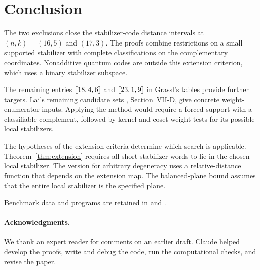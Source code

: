 \section{Conclusion}\label{sec:conclusion}

The two exclusions close the stabilizer-code distance intervals at
\((n,k)=(16,5)\) and \((17,3)\). The proofs combine restrictions on a
small supported stabilizer with complete classifications on the
complementary coordinates. Nonadditive quantum codes are outside this
extension criterion, which uses a binary stabilizer subspace.

The remaining entries \([\![18,4,6]\!]\) and \([\![23,1,9]\!]\) in
Grassl's tables \cite{grassl} provide further targets. Lai's remaining
candidate sets \cite{lai}, Section~VII-D, give concrete weight-enumerator
inputs. Applying the method would require a forced support with a
classifiable complement, followed by kernel and coset-weight tests for
its possible local stabilizers.

The hypotheses of the extension criteria determine which search is
applicable. Theorem~\ref{thm:extension} requires all short stabilizer words to lie in the chosen local
stabilizer. The version for arbitrary degeneracy uses a relative-distance
function that depends on the extension map. The balanced-plane bound
assumes that the entire local stabilizer is the specified plane.

Benchmark data and programs are retained in 
and .

\noindent\begin{minipage}{\linewidth}
\paragraph{Acknowledgments.}
We thank an expert reader for comments on an earlier draft.
Claude helped develop the proofs, write and debug the code, run the
computational checks, and revise the paper.
\end{minipage}
